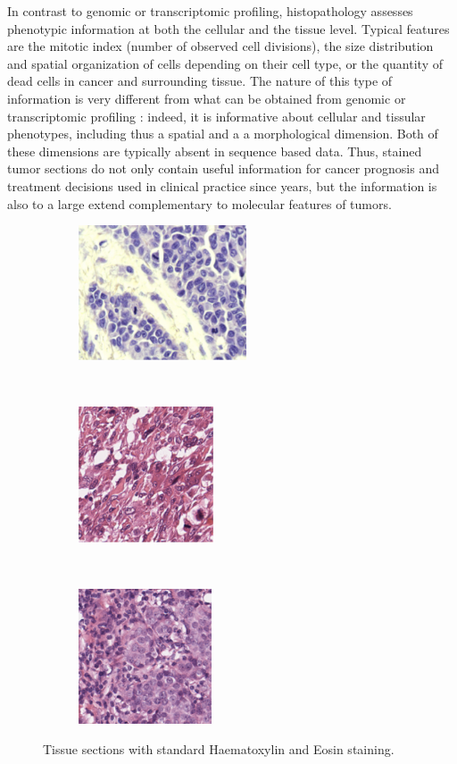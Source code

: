 \documentclass[a4paper,10pt]{article}
\begin{document}
In contrast to genomic or transcriptomic
profiling, histopathology assesses phenotypic information at both the
cellular and the tissue level. Typical features are the mitotic index
(number of observed cell divisions), the size distribution and spatial
organization of cells depending on their cell type, 
or the quantity of dead cells in cancer and surrounding tissue. The
nature of this type of information is very different from what can be
obtained from genomic or transcriptomic profiling : indeed, it is
informative about cellular and tissular phenotypes, including thus a
spatial and a a morphological dimension.  Both of these dimensions are
typically absent in sequence based data. Thus,
stained tumor sections do not only contain useful information for
cancer prognosis and treatment decisions used in clinical practice
since years, but the information is also
to a large extend complementary to molecular features of tumors. 

\begin{figure}[!ht]
\centering
\begin{subfigure}{.3\textwidth}
  \centering
  \includegraphics[height=4cm]{histo1.png}
  \caption{}
  \label{fig:sub1}
\end{subfigure}%
~
\begin{subfigure}{.3\textwidth}
  \centering
  \includegraphics[height=4cm]{histo2.png}
  \caption{}
  \label{fig:sub2}
\end{subfigure}
~
\begin{subfigure}{.3\textwidth}
  \centering
  \includegraphics[height=4cm]{histo3.png}
  \caption{}
  \label{fig:sub3}
\end{subfigure}
\caption{Tissue sections with standard Haematoxylin and Eosin staining.}
\label{fig:example_histopath}
\end{figure}
\end{document}
